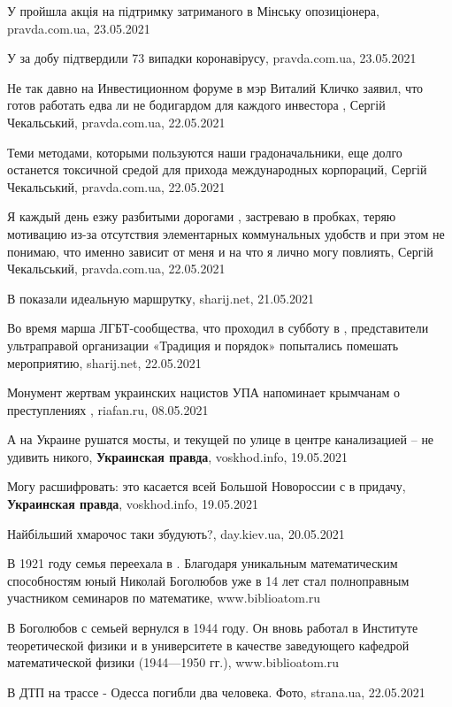 У  пройшла акція на підтримку затриманого в Мінську опозиціонера,
pravda.com.ua, 23.05.2021

У  за добу підтвердили 73 випадки коронавірусу, pravda.com.ua,
23.05.2021

Не так давно на Инвестиционном форуме в  мэр  Виталий
Кличко заявил, что готов работать едва ли не бодигардом для каждого инвестора
, Сергій Чекальський, pravda.com.ua, 22.05.2021

Теми методами, которыми пользуются наши градоначальники,  еще долго
останется токсичной средой для прихода международных корпораций, Сергій
Чекальський, pravda.com.ua, 22.05.2021

Я каждый день езжу разбитыми дорогами , застреваю в пробках, теряю
мотивацию из-за отсутствия элементарных коммунальных удобств и при этом не
понимаю, что именно зависит от меня и на что я лично могу повлиять, Сергій
Чекальський, pravda.com.ua, 22.05.2021

В  показали идеальную маршрутку, sharij.net, 21.05.2021

Во время марша ЛГБТ-сообщества, что проходил в субботу в ,
представители ультраправой организации «Традиция и порядок» попытались помешать
мероприятию, sharij.net, 22.05.2021

Монумент жертвам украинских нацистов УПА напоминает крымчанам о преступлениях
, riafan.ru, 08.05.2021

А на Украине рушатся мосты, и текущей по улице в центре  канализацией
– не удивить никого, \textbf{Украинская правда}, voskhod.info, 19.05.2021

Могу расшифровать: это касается всей Большой Новороссии с  в
придачу, \textbf{Украинская правда}, voskhod.info, 19.05.2021

Найбільший хмарочос  таки збудують?, day.kiev.ua, 20.05.2021

В 1921 году семья переехала в . Благодаря уникальным математическим
способностям юный Николай Боголюбов уже в 14 лет стал полноправным участником
семинаров по математике, www.biblioatom.ru

В  Боголюбов с семьей вернулся в 1944 году. Он вновь работал в
Институте теоретической физики и в  университете в качестве
заведующего кафедрой математической физики (1944—1950 гг.), www.biblioatom.ru

В ДТП на трассе  - Одесса погибли два человека. Фото, strana.ua, 22.05.2021

